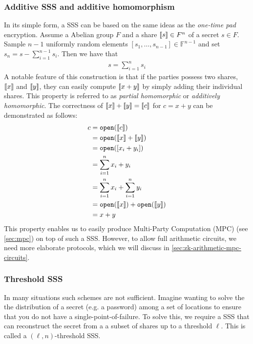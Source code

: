 \documentclass[twoside,11pt]{report}
\theoremstyle{definition}
\theoremstyle{plain}
\begin{document}
\subsubsection{Additive SSS and additive homomorphism}\label{sec:additive-sss}

In its simple form, a SSS can be based on the same ideas as the \textit{one-time pad} encryption. Assume a Abelian group $F$ and a share $\llbracket s \rrbracket \in F^n$ of a secret $s \in F$. Sample $n-1$ uniformly random elements $[s_1, \dots, s_{n-1}] \in \mathbb{F}^{n-1}$ and set $s_n = s - \sum_{i=1}^{n-1} s_i$. Then we have that
\begin{align*}
  s = \sum_{i=1}^{n} s_i
\end{align*}
A notable feature of this construction is that if the parties possess two shares, $\llbracket x \rrbracket$ and $\llbracket y \rrbracket$, they can easily compute $\llbracket x + y \rrbracket$ by simply adding their individual shares. This property is referred to as \textit{partial homomorphic} or \textit{additively homomorphic}. The correctness of $\llbracket x \rrbracket + \llbracket y \rrbracket = \llbracket c \rrbracket$ for $c = x + y$ can be demonstrated as follows:
\begin{align*}
  c & = \texttt{open}(\llbracket c \rrbracket)                         \\
    & = \texttt{open}(\llbracket x \rrbracket + \llbracket y \rrbracket)                \\
    & = \texttt{open}([x_i + y_i])                    \\
    & = \sum_{i=1}^{n} x_i + y_i                      \\
    & = \sum_{i=1}^{n} x_i + \sum_{i=1}^{n} y_i       \\
    & = \texttt{open}(\llbracket x \rrbracket) + \texttt{open}(\llbracket y \rrbracket) \\
    & = x + y
\end{align*}
This property enables us to easily produce Multi-Party Computation (MPC) (see \autoref{sec:mpc}) on top of such a SSS\@. However, to allow full arithmetic circuits, we need more elaborate protocols, which we will discuss in \autoref{sec:zk-arithmetic-mpc-circuits}.
\subsubsection{Threshold SSS}\label{sec:threshold-sss}

In many situations such schemes are not sufficient. Imagine wanting to solve the the distribution of a secret (e.g. a password) among a set of locations to ensure that you do not have a single-point-of-failure. To solve this, we require a SSS that can reconstruct the secret from a a subset of shares up to a threshold $\ell$. This is called a $(\ell, n)$-threshold SSS\@.
\end{document}

